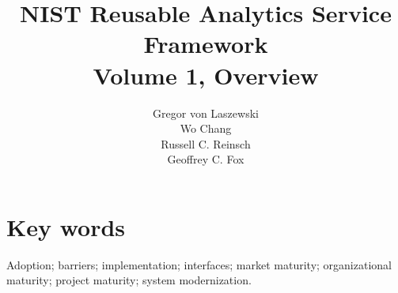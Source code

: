 \documentclass[11pt,fullpage]{article}
\newcommand{\TITLE}{NIST Reusable Analytics Service Framework\\
Volume 1, Overview}
\newcommand{\AUTHORS}{
\large Gregor von Laszewski\\
\large Wo Chang\\
\large Russell C. Reinsch\\
\large Geoffrey C. Fox\\
}
\begin{document}
% 

\title{\TITLE}
\author{\AUTHORS}
\maketitle






\section*{Key words}
\normalsize 

Adoption; barriers; implementation; interfaces; market maturity;
organizational maturity; project maturity; system modernization.\\

\pagebreak
\tableofcontents 
	
\listoftables

\listoffigures

\pagebreak

%
%



\end{document}
